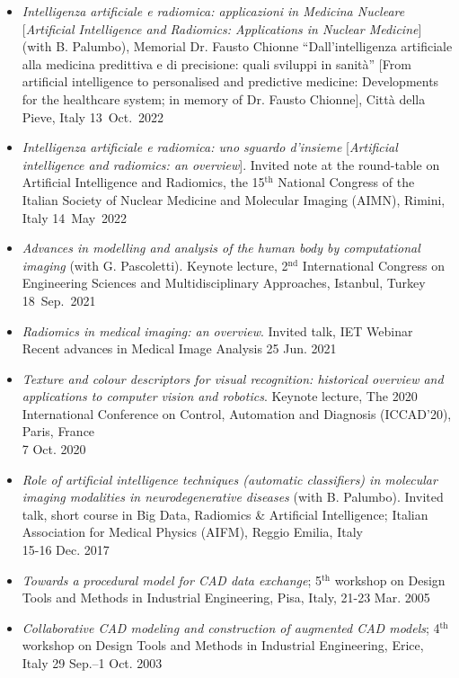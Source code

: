 \documentclass[11pt]{article}
\begin{document}
\begin{itemize}
\item \emph{Intelligenza artificiale e radiomica: applicazioni in Medicina Nucleare} [\emph{Artificial Intelligence and Radiomics: Applications in Nuclear Medicine}] (with B. Palumbo), Memorial Dr. Fausto Chionne ``Dall'intelligenza artificiale alla medicina predittiva e di precisione: quali sviluppi in sanità'' [From artificial intelligence to personalised and predictive medicine: Developments for the healthcare system; in memory of Dr. Fausto Chionne], Città della Pieve, Italy \hfill 13~Oct.~2022
		\item \emph{Intelligenza artificiale e radiomica: uno sguardo d'insieme} [\emph{Artificial intelligence and radiomics: an overview}]. Invited note at the round-table on Artificial Intelligence and Radiomics, the 15$^\text{th}$ National Congress of the Italian Society of Nuclear Medicine and Molecular Imaging (AIMN), Rimini, Italy \hfill 14~May~2022
	\item \emph{Advances in modelling and analysis of the human body by computational imaging} (with G. Pascoletti). Keynote lecture, 2$^\text{nd}$ International Congress on Engineering Sciences and Multidisciplinary Approaches, Istanbul, Turkey \hfill 18~Sep.~2021
	\item \emph{Radiomics in medical imaging: an overview}. Invited talk, IET Webinar Recent advances in Medical Image Analysis \hfill 25 Jun. 2021
	\item \emph{Texture and colour descriptors for visual recognition: historical overview and applications to computer vision and robotics}. Keynote lecture, The 2020 International Conference on Control, Automation and Diagnosis (ICCAD’20), Paris, France \\ \mbox{} \hfill 7 Oct. 2020
	\item \emph{Role of artificial intelligence techniques (automatic classifiers) in molecular imaging modalities in neurodegenerative diseases} (with B. Palumbo). Invited talk, short course in Big Data, Radiomics \& Artificial Intelligence; Italian Association for Medical Physics (AIFM), Reggio Emilia, Italy \\ \mbox{} \hfill 15-16 Dec. 2017
	\item \emph{Towards a procedural model for CAD data exchange}; 5$^\text{th}$ workshop on Design Tools and Methods in Industrial Engineering, Pisa, Italy, \hfill 21-23 Mar. 2005
	\item \emph{Collaborative CAD modeling and construction of augmented CAD models}; 4$^\text{th}$ workshop on Design Tools and Methods in Industrial Engineering, Erice, Italy \hfill 29 Sep.--1 Oct. 2003

\end{itemize}
\end{document}
